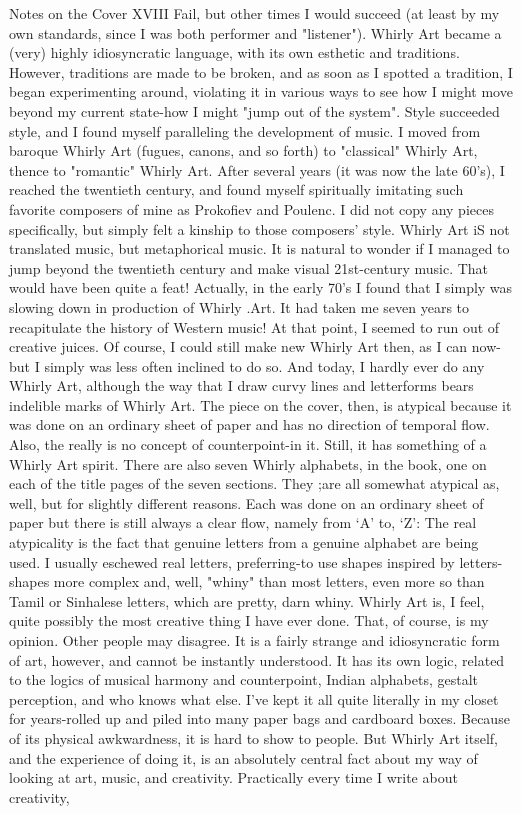 Notes on the Cover                                                               XVIII Fail, but other times I would succeed (at least by my own standards, since I was both performer and "listener"). Whirly Art became a (very) highly idiosyncratic language, with its own esthetic and traditions. However, traditions are made to be broken, and as soon as I spotted a tradition, I began experimenting around, violating it in various ways to see how I might move beyond my current state-how I might "jump out of the system". Style succeeded style, and I found myself paralleling the development of music. I moved from baroque Whirly Art (fugues, canons, and so forth) to "classical" Whirly Art, thence to "romantic" Whirly Art. After several years (it was now the late 60's), I reached the twentieth century, and found myself spiritually imitating such favorite composers of mine as Prokofiev and Poulenc. I did not copy any pieces specifically, but simply felt a kinship to those composers' style. Whirly Art iS not translated music, but metaphorical music. It is natural to wonder if I managed to jump beyond the twentieth century and make visual 21st-century music. That would have been quite a feat! Actually, in the early 70's I found that I simply was slowing down in production of Whirly .Art. It had taken me seven years to recapitulate the history of Western music! At that point, I seemed to run out of creative juices. Of course, I could still make new Whirly Art then, as I can now-but I simply was less often inclined to do so. And today, I hardly ever do any Whirly Art, although the way that I draw curvy lines and letterforms bears indelible marks of Whirly Art. The piece on the cover, then, is atypical because it was done on an ordinary sheet of paper and has no direction of temporal flow. Also, the really is no concept of counterpoint-in it. Still, it has something of a Whirly Art spirit. There are also seven Whirly alphabets, in the book, one on each of the title pages of the seven sections. They ;are all somewhat atypical as, well, but for slightly different reasons. Each was done on an ordinary sheet of paper but there is still always a clear flow, namely from `A' to, `Z': The real atypicality is the fact that genuine letters from a genuine alphabet are being used. I usually eschewed real letters, preferring-to use shapes inspired by letters-shapes more complex and, well, "whiny" than most letters, even more so than Tamil or Sinhalese letters, which are pretty, darn whiny. Whirly Art is, I feel, quite possibly the most creative thing I have ever done. That, of course, is my opinion. Other people may disagree. It is a fairly strange and idiosyncratic form of art, however, and cannot be instantly understood. It has its own logic, related to the logics of musical harmony and counterpoint, Indian alphabets, gestalt perception, and who knows what else. I've kept it all quite literally in my closet for years-rolled up and piled into many paper bags and cardboard boxes. Because of its physical awkwardness, it is hard to show to people. But Whirly Art itself, and the experience of doing it, is an absolutely central fact about my way of looking at art, music, and creativity. Practically every time I write about creativity, 



